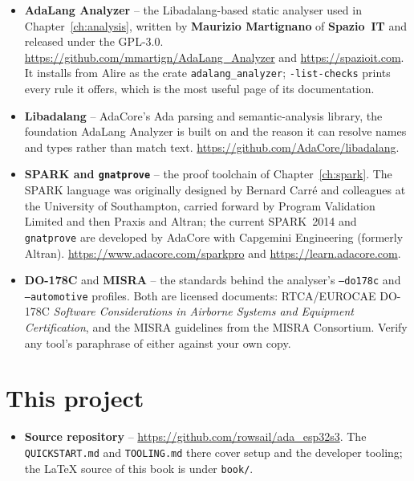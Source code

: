 \begin{itemize}
\item \textbf{AdaLang Analyzer} -- the Libadalang-based static analyser used in
  Chapter~\ref{ch:analysis}, written by \textbf{Maurizio Martignano} of
  \textbf{Spazio~IT} and released under the GPL-3.0.
  \url{https://github.com/mmartign/AdaLang_Analyzer} and
  \url{https://spazioit.com}. It installs from Alire as the crate
  \texttt{adalang\_analyzer}; \texttt{-list-checks} prints every rule it offers,
  which is the most useful page of its documentation.
\item \textbf{Libadalang} -- AdaCore's Ada parsing and semantic-analysis library,
  the foundation AdaLang Analyzer is built on and the reason it can resolve names
  and types rather than match text.
  \url{https://github.com/AdaCore/libadalang}.
\item \textbf{SPARK and \texttt{gnatprove}} -- the proof toolchain of
  Chapter~\ref{ch:spark}. The SPARK language was originally designed by
  Bernard Carr\'e and colleagues at the University of Southampton, carried
  forward by Program Validation Limited and then Praxis and Altran; the current
  SPARK~2014 and \texttt{gnatprove} are developed by AdaCore with Capgemini
  Engineering (formerly Altran). \url{https://www.adacore.com/sparkpro} and
  \url{https://learn.adacore.com}.
\item \textbf{DO-178C} and \textbf{MISRA} -- the standards behind the analyser's
  \texttt{--do178c} and \texttt{--automotive} profiles. Both are licensed
  documents: RTCA/EUROCAE DO-178C \emph{Software Considerations in Airborne
  Systems and Equipment Certification}, and the MISRA guidelines from the MISRA
  Consortium. Verify any tool's paraphrase of either against your own copy.
\end{itemize}

\section{This project}

\begin{itemize}
\item \textbf{Source repository} --
  \url{https://github.com/rowsail/ada_esp32s3}. The
  \texttt{QUICKSTART.md} and \texttt{TOOLING.md} there cover setup and the
  developer tooling; the \LaTeX{} source of this book is under \texttt{book/}.
\end{itemize}
